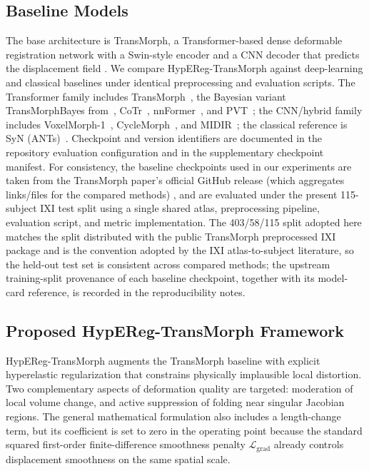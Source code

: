 \documentclass[jimaging,article,submit,pdftex,moreauthors]{Definitions/mdpi}
\begin{document}
\subsection{Baseline Models}
The base architecture is TransMorph, a Transformer-based dense deformable registration network with a Swin-style encoder and a CNN decoder that predicts the displacement field \cite{chen2022transmorph,liu2021swin}. We compare HypEReg-TransMorph against deep-learning and classical baselines under identical preprocessing and evaluation scripts. The Transformer family includes TransMorph~\cite{chen2022transmorph}, the Bayesian variant TransMorphBayes from~\cite{chen2022transmorph}, CoTr~\cite{xie2021cotr}, nnFormer~\cite{zhou2023nnformer}, and PVT~\cite{wang2021pvt}; the CNN/hybrid family includes VoxelMorph-1~\cite{balakrishnan2019voxelmorph}, CycleMorph~\cite{kim2021cyclemorph}, and MIDIR~\cite{qiu2021midir}; the classical reference is SyN (ANTs)~\cite{avants2008ants}. Checkpoint and version identifiers are documented in the repository evaluation configuration and in the supplementary checkpoint manifest. For consistency, the baseline checkpoints used in our experiments are taken from the TransMorph paper's official GitHub release (which aggregates links/files for the compared methods) \cite{chen2022transmorph_github}, and are evaluated under the present 115-subject IXI test split using a single shared atlas, preprocessing pipeline, evaluation script, and metric implementation. The 403/58/115 split adopted here matches the split distributed with the public TransMorph preprocessed IXI package and is the convention adopted by the IXI atlas-to-subject literature, so the held-out test set is consistent across compared methods; the upstream training-split provenance of each baseline checkpoint, together with its model-card reference, is recorded in the reproducibility notes.

\subsection{Proposed HypEReg-TransMorph Framework}
HypEReg-TransMorph augments the TransMorph baseline with explicit hyperelastic regularization that constrains physically implausible local distortion. Two complementary aspects of deformation quality are targeted: moderation of local volume change, and active suppression of folding near singular Jacobian regions. The general mathematical formulation also includes a length-change term, but its coefficient is set to zero in the operating point because the standard squared first-order finite-difference smoothness penalty \(\mathcal{L}_{\mathrm{grad}}\) already controls displacement smoothness on the same spatial scale.
\end{document}
